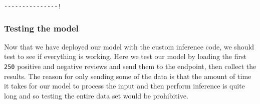 \documentclass[11pt]{article}
\begin{document}
    \begin{Verbatim}[commandchars=\\\{\}]
---------------!
    \end{Verbatim}

    \hypertarget{testing-the-model}{%
\subsubsection{Testing the model}\label{testing-the-model}}

Now that we have deployed our model with the custom inference code, we
should test to see if everything is working. Here we test our model by
loading the first \texttt{250} positive and negative reviews and send
them to the endpoint, then collect the results. The reason for only
sending some of the data is that the amount of time it takes for our
model to process the input and then perform inference is quite long and
so testing the entire data set would be prohibitive.
\end{document}

